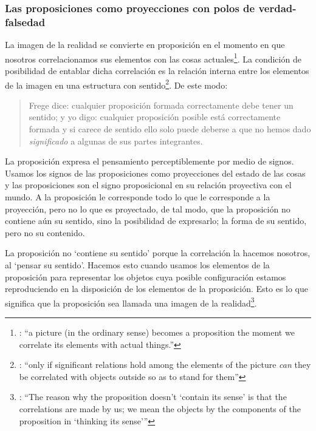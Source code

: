 \subsubsection{Las proposiciones como proyecciones con polos de verdad-falsedad}

La imagen de la realidad se convierte en proposición en el momento en que nosotros correlacionamos sus elementos con las cosas actuales\footnote{\cite[Cf.~][73]{anscombe1959iwt}: \enquote{a picture (in the ordinary sense) becomes a proposition the moment we correlate its elements with actual things.}}. La condición de posibilidad de entablar dicha correlación es la relación interna entre los elementos de la imagen en una estructura con sentido\footnote{\cite[Cf.~][68]{anscombe1959iwt}: \enquote{only if significant relations hold among the elements of the picture \emph{can} they be correlated with objects outside so as to stand for them}}. De este modo: \blockquote[{\cite[\S5.4733]{wittgenstein1922tractatuses}}]{Frege dice: cualquier proposición formada correctamente debe tener un sentido; y yo digo: cualquier proposición posible está correctamente formada y si carece de sentido ello solo puede deberse a que no hemos dado \emph{significado} a algunas de sus partes integrantes.}

La proposición expresa el pensamiento perceptiblemente por medio de signos. Usamos los signos de las proposiciones como proyecciones del estado de las cosas y las proposiciones son el signo proposicional en su relación proyectiva con el mundo. A la proposición le corresponde todo lo que le corresponde a la proyección, pero no lo que es proyectado, de tal modo, que la proposición no contiene aún su sentido, sino la posibilidad de expresarlo; la forma de su sentido, pero no su contenido.\autocite[Cf.~][\S3.1, \S3.11--\S3.13]{wittgenstein1922tractatuses}

La proposición no `contiene su sentido' porque la correlación la hacemos nosotros, al `pensar su sentido'. Hacemos esto cuando usamos los elementos de la proposición para representar los objetos cuya posible configuración estamos reproduciendo en la disposición de los elementos de la proposición. Esto es lo que significa que la proposición sea llamada una imagen de la realidad\footnote{\cite[cf.~][69]{anscombe1959iwt}: \enquote{The reason why the proposition doesn't `contain its sense' is that the correlations are made by us; we mean the objects by the components of the proposition in `thinking its sense'}}.

